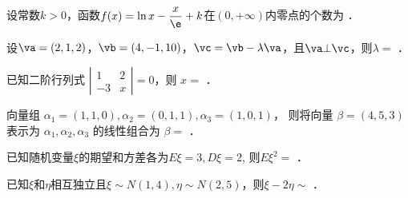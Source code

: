 \documentclass{jnuexam}
\begin{document}
\renewcommand{\niandu}{2017--2018}
\renewcommand{\xueqi}{2}
\renewcommand{\kecheng}{大学数学}
\renewcommand{\zhuanye}{理工四学分} %
\renewcommand{\jiaoshi}{张三，李四，王五} %
\renewcommand{\shijian}{2018~年~06~月~28~日}
\renewcommand{\bixiu}{1} %
\renewcommand{\bijuan}{1} %
\renewcommand{\shijuan}{A} %
\renewcommand{\neizhao}{1} %
\renewcommand{\waizhao}{0} %

\makehead %



\newpageb %

\begin{problem}
设常数$k>0$，函数$f(x)=\ln x-\dfrac{x}{\e}+k$在$(0,+\infty)$内零点的个数为 ．
\end{problem}

\vfill

\begin{problem}
设$\va=(2,1,2)$，$\vb=(4,-1,10)$，$\vc=\vb-\lambda\va$，且$\va\bot\vc$，则$\lambda=$ ．
\end{problem}

\vfill

\begin{problem}
已知二阶行列式 $\left|\begin{array}{cc}
  1 & 2\\
  - 3 & x
\end{array}\right|=0$，则 $x=$ ．
\end{problem}

\vfill

\begin{problem}
向量组 $\alpha_1=(1,1,0), \alpha_2=(0,1,1), \alpha_3=(1,0,1)$，
则将向量 $\beta=(4, 5, 3)$ 表示为 $\alpha_1, \alpha_2, \alpha_3$
的线性组合为 $\beta=$ ．
\end{problem}

\vfill

\begin{problem}
已知随机变量$\xi$的期望和方差各为$E\xi=3, D\xi=2$, 则$E\xi^2=$ ．
\end{problem}

\vfill

\begin{problem}
已知$\xi$和$\eta$相互独立且$\xi\sim N(1,4), \eta\sim N(2,5)$，则$\xi-2\eta\sim$ ．
\end{problem}
\end{document}
